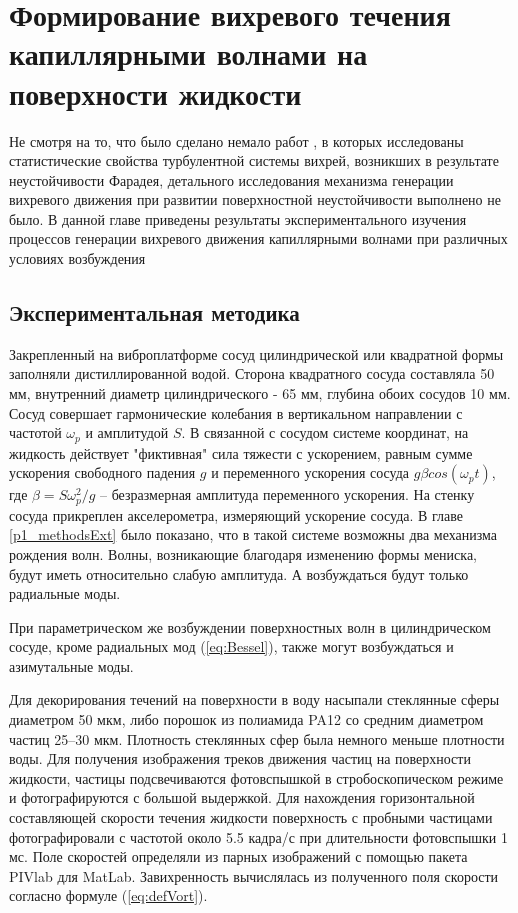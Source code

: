 

\chapter{Формирование вихревого течения капиллярными волнами на поверхности жидкости} \label{chapt3}

Не смотря на то, что было сделано немало работ \cite{VonKameke2011, Francois2014, Francois2013}, в которых исследованы статистические свойства турбулентной системы вихрей, возникших в результате неустойчивости Фарадея, детального исследования механизма генерации вихревого движения при развитии поверхностной неустойчивости выполнено не было. В данной главе приведены результаты экспериментального изучения процессов генерации вихревого движения капиллярными волнами при различных условиях возбуждения


\section{Экспериментальная методика}\label{sect3_2}
Закрепленный на виброплатформе сосуд цилиндрической или квадратной формы заполняли дистиллированной водой. Сторона квадратного сосуда составляла 50 мм, внутренний диаметр цилиндрического - 65 мм, глубина обоих сосудов 10 мм. Сосуд совершает гармонические колебания в вертикальном направлении с частотой $\omega_p$ и амплитудой $S$. В связанной с сосудом системе координат, на жидкость действует "фиктивная" сила тяжести с ускорением, равным сумме ускорения свободного падения $g$ и переменного ускорения сосуда $g \beta cos(\omega_p t)$, где $\beta = S \omega_p^2/g$ – безразмерная амплитуда переменного ускорения. На стенку сосуда прикреплен акселерометра, измеряющий ускорение сосуда. В главе \ref{p1_methodsExt} было показано, что в такой системе возможны два механизма рождения волн. Волны, возникающие благодаря изменению формы мениска, будут иметь относительно слабую амплитуда. А возбуждаться будут только радиальные моды.

При параметрическом же возбуждении поверхностных волн в цилиндрическом сосуде, кроме радиальных мод (\ref{eq:Bessel}), также могут возбуждаться и азимутальные моды.

Для декорирования течений на поверхности в воду насыпали стеклянные сферы диаметром 50 мкм, либо порошок из полиамида PA12 со средним диаметром частиц 25–30 мкм. Плотность стеклянных сфер была немного меньше плотности воды. Для получения изображения треков движения частиц на поверхности жидкости, частицы подсвечиваются фотовспышкой в стробоскопическом режиме и фотографируются с большой выдержкой. Для нахождения горизонтальной составляющей скорости течения жидкости поверхность с пробными частицами фотографировали с частотой около 5.5 кадра/с при длительности фотовспышки 1 мс. Поле скоростей определяли из парных изображений с помощью пакета PIVlab \cite{PIVlab, PIVlab1} для MatLab. 
Завихренность вычислялась из полученного поля скорости согласно формуле (\ref{eq:defVort}).


